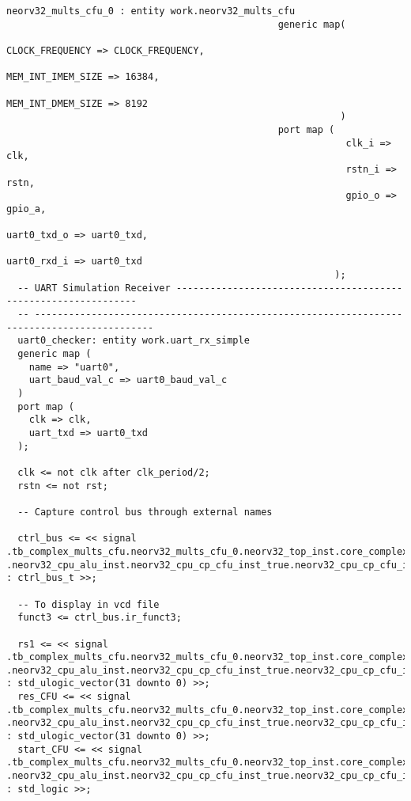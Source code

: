 \begin{code}
\begin{verbatim}
neorv32_mults_cfu_0 : entity work.neorv32_mults_cfu
                                                generic map(
                                                            CLOCK_FREQUENCY => CLOCK_FREQUENCY,
                                                            MEM_INT_IMEM_SIZE => 16384,
                                                            MEM_INT_DMEM_SIZE => 8192
                                                           )
                                                port map (
                                                            clk_i => clk,
                                                            rstn_i => rstn,
                                                            gpio_o => gpio_a,
                                                            uart0_txd_o => uart0_txd,
                                                            uart0_rxd_i => uart0_txd
                                                          );
  -- UART Simulation Receiver ---------------------------------------------------------------
  -- -------------------------------------------------------------------------------------------
  uart0_checker: entity work.uart_rx_simple
  generic map (
    name => "uart0",
    uart_baud_val_c => uart0_baud_val_c
  )
  port map (
    clk => clk,
    uart_txd => uart0_txd
  );

  clk <= not clk after clk_period/2;
  rstn <= not rst;

  -- Capture control bus through external names

  ctrl_bus <= << signal .tb_complex_mults_cfu.neorv32_mults_cfu_0.neorv32_top_inst.core_complex.neorv32_cpu_inst .neorv32_cpu_alu_inst.neorv32_cpu_cp_cfu_inst_true.neorv32_cpu_cp_cfu_inst.ctrl_i : ctrl_bus_t >>;

  -- To display in vcd file 
  funct3 <= ctrl_bus.ir_funct3;

  rs1 <= << signal .tb_complex_mults_cfu.neorv32_mults_cfu_0.neorv32_top_inst.core_complex.neorv32_cpu_inst .neorv32_cpu_alu_inst.neorv32_cpu_cp_cfu_inst_true.neorv32_cpu_cp_cfu_inst.rs1_i : std_ulogic_vector(31 downto 0) >>;
  res_CFU <= << signal .tb_complex_mults_cfu.neorv32_mults_cfu_0.neorv32_top_inst.core_complex.neorv32_cpu_inst .neorv32_cpu_alu_inst.neorv32_cpu_cp_cfu_inst_true.neorv32_cpu_cp_cfu_inst.res_o : std_ulogic_vector(31 downto 0) >>;
  start_CFU <= << signal .tb_complex_mults_cfu.neorv32_mults_cfu_0.neorv32_top_inst.core_complex.neorv32_cpu_inst .neorv32_cpu_alu_inst.neorv32_cpu_cp_cfu_inst_true.neorv32_cpu_cp_cfu_inst.start_i : std_logic >>;


\end{verbatim}
\end{code}
